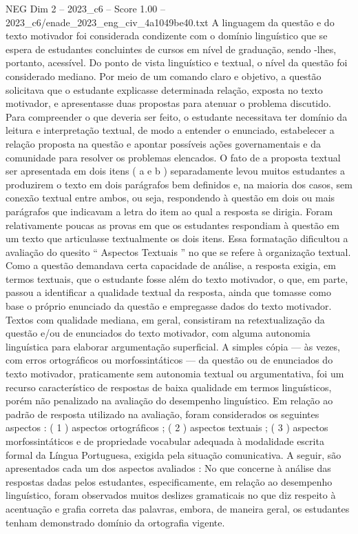 \begin{textsample}{NEG Dim 2 – 2023\_c6 – Score 1.00 – 2023\_c6/enade\_2023\_eng\_civ\_4a1049be40.txt}
A linguagem da questão e do texto motivador foi considerada condizente com o domínio linguístico que se espera de estudantes concluintes de cursos em nível de graduação, sendo -lhes, portanto, acessível.
Do ponto de vista linguístico e textual, o nível da questão foi considerado mediano.
Por meio de um comando claro e objetivo, a questão solicitava que o estudante explicasse determinada relação, exposta no texto motivador, e apresentasse duas propostas para atenuar o problema discutido.
Para compreender o que deveria ser feito, o estudante necessitava ter domínio da leitura e interpretação textual, de modo a entender o enunciado, estabelecer a relação proposta na questão e apontar possíveis ações governamentais e da comunidade para resolver os problemas elencados.
O fato de a proposta textual ser apresentada em dois itens ( a e b ) separadamente levou muitos estudantes a produzirem o texto em dois parágrafos bem definidos e, na maioria dos casos, sem conexão textual entre ambos, ou seja, respondendo à questão em dois ou mais parágrafos que indicavam a letra do item ao qual a resposta se dirigia.
Foram relativamente poucas as provas em que os estudantes respondiam à questão em um texto que articulasse textualmente os dois itens.
Essa formatação dificultou a avaliação do quesito “ Aspectos Textuais ” no que se refere à organização textual.
Como a questão demandava certa capacidade de análise, a resposta exigia, em termos textuais, que o estudante fosse além do texto motivador, o que, em parte, passou a identificar a qualidade textual da resposta, ainda que tomasse como base o próprio enunciado da questão e empregasse dados do texto motivador.
Textos com qualidade mediana, em geral, consistiram na retextualização da questão e/ou de enunciados do texto motivador, com alguma autonomia linguística para elaborar argumentação superficial.
A simples cópia — às vezes, com erros ortográficos ou morfossintáticos — da questão ou de enunciados do texto motivador, praticamente sem autonomia textual ou argumentativa, foi um recurso característico de respostas de baixa qualidade em termos linguísticos, porém não penalizado na avaliação do desempenho linguístico.
Em relação ao padrão de resposta utilizado na avaliação, foram considerados os seguintes aspectos : ( 1 ) aspectos ortográficos ; ( 2 ) aspectos textuais ; ( 3 ) aspectos morfossintáticos e de propriedade vocabular adequada à modalidade escrita formal da Língua Portuguesa, exigida pela situação comunicativa.
A seguir, são apresentados cada um dos aspectos avaliados : No que concerne à análise das respostas dadas pelos estudantes, especificamente, em relação ao desempenho linguístico, foram observados muitos deslizes gramaticais no que diz respeito à acentuação e grafia correta das palavras, embora, de maneira geral, os estudantes tenham demonstrado domínio da ortografia vigente.

\end{textsample}
